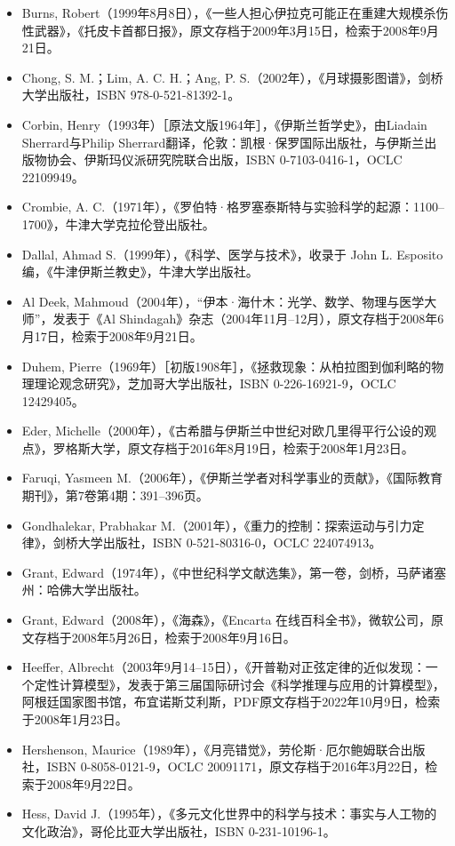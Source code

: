 \begin{itemize}
\item Burns, Robert（1999年8月8日），《一些人担心伊拉克可能正在重建大规模杀伤性武器》，《托皮卡首都日报》，原文存档于2009年3月15日，检索于2008年9月21日。
\item  Chong, S. M.；Lim, A. C. H.；Ang, P. S.（2002年），《月球摄影图谱》，剑桥大学出版社，ISBN 978-0-521-81392-1。
\item Corbin, Henry（1993年）［原法文版1964年］，《伊斯兰哲学史》，由Liadain Sherrard与Philip Sherrard翻译，伦敦：凯根·保罗国际出版社，与伊斯兰出版物协会、伊斯玛仪派研究院联合出版，ISBN 0-7103-0416-1，OCLC 22109949。
\item Crombie, A. C.（1971年），《罗伯特·格罗塞泰斯特与实验科学的起源：1100–1700》，牛津大学克拉伦登出版社。
\item Dallal, Ahmad S.（1999年），《科学、医学与技术》，收录于 John L. Esposito 编，《牛津伊斯兰教史》，牛津大学出版社。
\item Al Deek, Mahmoud（2004年），“伊本·海什木：光学、数学、物理与医学大师”，发表于《Al Shindagah》杂志（2004年11月–12月），原文存档于2008年6月17日，检索于2008年9月21日。
\item Duhem, Pierre（1969年）［初版1908年］，《拯救现象：从柏拉图到伽利略的物理理论观念研究》，芝加哥大学出版社，ISBN 0-226-16921-9，OCLC 12429405。
\item Eder, Michelle（2000年），《古希腊与伊斯兰中世纪对欧几里得平行公设的观点》，罗格斯大学，原文存档于2016年8月19日，检索于2008年1月23日。
\item Faruqi, Yasmeen M.（2006年），《伊斯兰学者对科学事业的贡献》，《国际教育期刊》，第7卷第4期：391–396页。
\item Gondhalekar, Prabhakar M.（2001年），《重力的控制：探索运动与引力定律》，剑桥大学出版社，ISBN 0-521-80316-0，OCLC 224074913。
\item Grant, Edward（1974年），《中世纪科学文献选集》，第一卷，剑桥，马萨诸塞州：哈佛大学出版社。
\item Grant, Edward（2008年），《海森》，《Encarta 在线百科全书》，微软公司，原文存档于2008年5月26日，检索于2008年9月16日。
\item Heeffer, Albrecht（2003年9月14–15日），《开普勒对正弦定律的近似发现：一个定性计算模型》，发表于第三届国际研讨会《科学推理与应用的计算模型》，阿根廷国家图书馆，布宜诺斯艾利斯，PDF原文存档于2022年10月9日，检索于2008年1月23日。
\item Hershenson, Maurice（1989年），《月亮错觉》，劳伦斯·厄尔鲍姆联合出版社，ISBN 0-8058-0121-9，OCLC 20091171，原文存档于2016年3月22日，检索于2008年9月22日。
\item Hess, David J.（1995年），《多元文化世界中的科学与技术：事实与人工物的文化政治》，哥伦比亚大学出版社，ISBN 0-231-10196-1。

\end{itemize}
